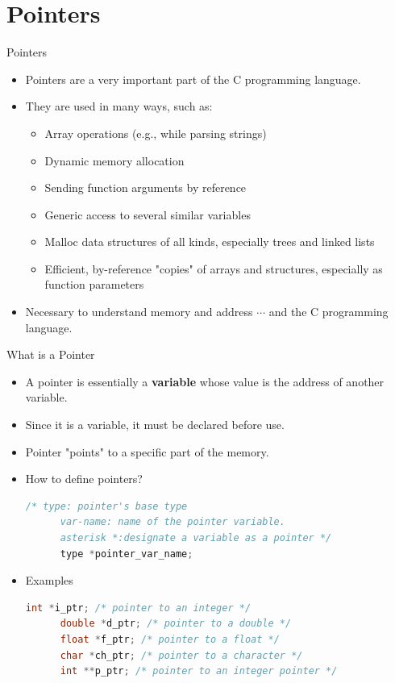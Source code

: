 \documentclass[10pt,t]{beamer}
\begin{document}
\section{Pointers}
\begin{frame}{Pointers}
  \begin{itemize}
  \item Pointers are a very important part of the C programming language.
  \item They are used in many ways, such as:
    \begin{itemize}
    \item Array operations (e.g., while parsing strings)
    \item Dynamic memory allocation
    \item Sending function arguments by reference
    \item Generic access to several similar variables
    \item Malloc data structures of all kinds, especially trees and linked lists
    \item Efficient, by-reference "copies" of arrays and structures, especially as function parameters
    \end{itemize}
  \item Necessary to understand memory and address $\cdots$ and the C programming language.
  \end{itemize}
\end{frame}

\begin{frame}[fragile]{What is a Pointer}
  \begin{itemize}
  \item A pointer is essentially a \textbf{\color{red}variable} whose value is the address of another variable.
  \item Since it is a variable, it must be declared before use.
  \item Pointer "points" to a specific part of the memory.
  \item How to define pointers?
    \begin{lstlisting}[language=C,basicstyle=\scriptsize\ttfamily]
      /* type: pointer's base type
      var-name: name of the pointer variable.
      asterisk *:designate a variable as a pointer */
      type *pointer_var_name;
    \end{lstlisting}
  \item Examples
    \begin{lstlisting}[language=C,basicstyle=\scriptsize\ttfamily]
      int *i_ptr; /* pointer to an integer */
      double *d_ptr; /* pointer to a double */
      float *f_ptr; /* pointer to a float */
      char *ch_ptr; /* pointer to a character */
      int **p_ptr; /* pointer to an integer pointer */
    \end{lstlisting}
  \end{itemize}
\end{frame}
\end{document}
